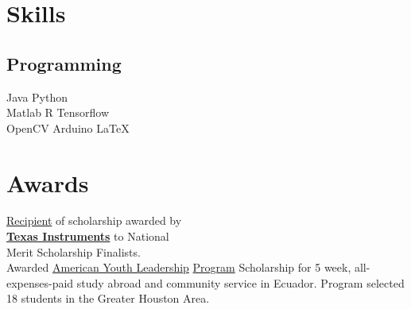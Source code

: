 \documentclass[]{deedy-resume-openfont}
\begin{document}
%
%


%
%

\begin{minipage}[t]{0.33\textwidth}


\section{Skills}
\subsection{Programming}
Java \textbullet{} Python  \\

Matlab \textbullet{} R \textbullet{} 
 Tensorflow \\ \textbullet{} OpenCV \textbullet{} Arduino \textbullet{} \LaTeX\ \\
\vspace{\topsep} 

\sectionsep


\section{Awards}
\vspace{1 mm}
\underline{Recipient} of scholarship awarded by \\ \textbf{\href{https://goo.gl/Yi8edi}{Texas Instruments}} to  National \\ Merit Scholarship Finalists. \\
\vspace{\topsep}
\vspace{1 mm}
\vspace{1 mm}
Awarded \underline{American Youth Leadership} \underline{Program} Scholarship for 5 week, all-expenses-paid study abroad and community service in Ecuador. Program selected 18 students in the Greater Houston Area. \\
\vspace{\topsep} 



\end{minipage}
\end{document}
